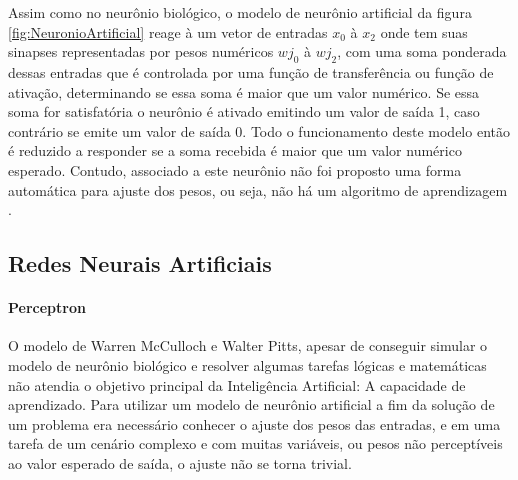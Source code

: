 \documentclass[	12pt, Times, openright, twoside, a4paper, english, brazil]{abntex2}
\begin{document}
            \begin{figure}[H]
            \end{figure}

            Assim como no neurônio biológico, o modelo de neurônio artificial da figura \ref{fig:NeuronioArtificial} reage à um vetor de entradas $x_0$ à $x_2$ onde tem suas sinapses representadas por pesos numéricos $wj_0$ à $wj_2$, com uma soma ponderada dessas entradas que é controlada por uma função de transferência ou função de ativação, determinando se essa soma é maior que um valor numérico. Se essa soma for satisfatória o neurônio é ativado emitindo um valor de saída 1, caso contrário se emite um valor de saída 0.
            Todo o funcionamento deste modelo então é reduzido a responder se a soma recebida é maior que um valor numérico esperado. Contudo, associado a este neurônio não foi proposto uma forma automática para ajuste dos pesos, ou seja, não há um algoritmo de aprendizagem \cite{Haykin1994}.
        
        \subsection{Redes Neurais Artificiais}
          \paragraph*{Perceptron}
            O modelo de Warren McCulloch e Walter Pitts, apesar de conseguir simular o modelo de neurônio biológico e resolver algumas tarefas lógicas e matemáticas não atendia o objetivo principal da Inteligência Artificial: A capacidade de aprendizado.
            Para utilizar um modelo de neurônio artificial a fim da solução de um problema era necessário conhecer o ajuste dos pesos das entradas, e em uma tarefa de um cenário complexo e com muitas variáveis, ou pesos não perceptíveis ao valor esperado de saída, o ajuste não se torna trivial.
            
\end{document}
